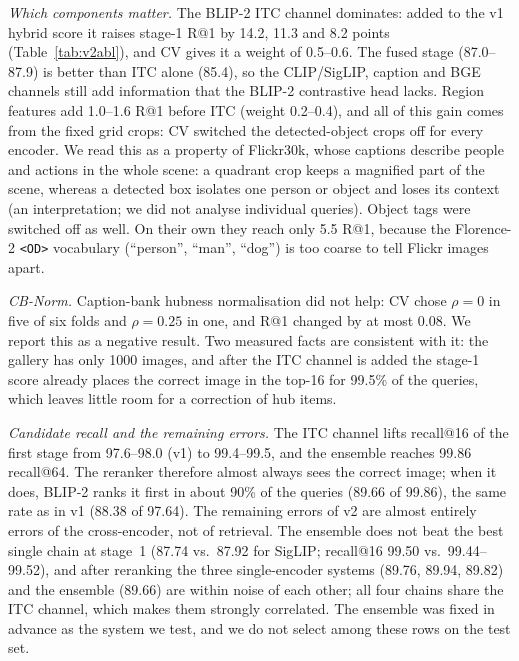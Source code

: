 \documentclass[conference]{IEEEtran}
\begin{document}
\emph{Which components matter.} The BLIP-2 ITC channel dominates: added to the v1 hybrid score it raises stage-1
R@1 by 14.2, 11.3 and 8.2 points (Table~\ref{tab:v2abl}), and CV gives it a weight of 0.5--0.6. The fused stage
(87.0--87.9) is better than ITC alone (85.4), so the CLIP/SigLIP, caption and BGE channels still add information
that the BLIP-2 contrastive head lacks. Region features add 1.0--1.6 R@1 before ITC (weight 0.2--0.4), and all of
this gain comes from the fixed grid crops: CV switched the detected-object crops off for every encoder. We read this
as a property of Flickr30k, whose captions describe people and actions in the whole scene: a quadrant crop keeps a
magnified part of the scene, whereas a detected box isolates one person or object and loses its context (an
interpretation; we did not analyse individual queries). Object tags were switched off as well. On their own they
reach only 5.5 R@1, because the Florence-2 \texttt{<OD>} vocabulary (``person'', ``man'', ``dog'') is too coarse to
tell Flickr images apart.

\emph{CB-Norm.} Caption-bank hubness normalisation did not help: CV chose $\rho=0$ in five of six folds and
$\rho=0.25$ in one, and R@1 changed by at most 0.08. We report this as a negative result. Two measured facts are
consistent with it: the gallery has only 1000 images, and after the ITC channel is added the stage-1 score already
places the correct image in the top-16 for 99.5\% of the queries, which leaves little room for a correction of hub
items.

\emph{Candidate recall and the remaining errors.} The ITC channel lifts recall@16 of the first stage from
97.6--98.0 (v1) to 99.4--99.5, and the ensemble reaches 99.86 recall@64. The reranker therefore almost always sees
the correct image; when it does, BLIP-2 ranks it first in about 90\% of the queries (89.66 of 99.86), the same rate
as in v1 (88.38 of 97.64). The remaining errors of v2 are almost entirely errors of the cross-encoder, not of
retrieval. The ensemble does not beat the best single chain at stage~1 (87.74 vs.\ 87.92 for SigLIP; recall@16 99.50 vs.\
99.44--99.52), and after reranking the three single-encoder systems (89.76, 89.94, 89.82) and the ensemble (89.66) are within noise of each
other; all four chains share the ITC channel, which makes them strongly correlated. The ensemble was fixed in
advance as the system we test, and we do not select among these rows on the test set.
\end{document}

